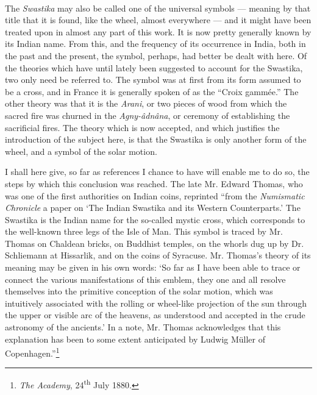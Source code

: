 \documentclass[a4paper, 11pt, oneside, polutonikogreek, english]{article}
\begin{document}
\paragraph{}
The \emph{Swastika} may also be called one of the universal symbols --- meaning by that title that it is found, like the wheel, almost everywhere --- and it might have been treated upon in almost any part of this work. It is now pretty generally known by its Indian name. From this, and the frequency of its occurrence in India, both in the past and the present, the symbol, perhaps, had better be dealt with here. Of the theories which have until lately been suggested to account for the Swastika, two only need be referred to. The symbol was at first from its form assumed to be a cross, and in France it is generally spoken of as the ``Croix gammée.'' The other theory was that it is the \emph{Arani}, or two pieces of wood from which the sacred fire was churned in the \emph{Agny-âdnâna}, or ceremony of establishing the sacrificial fires. The theory which is now accepted, and which justifies the introduction of the subject here, is that the Swastika is only another form of the wheel, and a symbol of the solar motion.

I shall here give, so far as references I chance to have will enable me to do so, the steps by which this conclusion was reached. The late Mr. Edward Thomas, who was one of the first authorities on Indian coins, reprinted ``from the \emph{Numismatic Chronicle} a paper on `The Indian Swastika and its Western Counterparts.' The Swastika is the Indian name for the so-called mystic cross, which corresponds to the well-known three legs of the Isle of Man. This symbol is traced by Mr. Thomas on Chaldean bricks, on Buddhist temples, on the whorls dug up by Dr. Schliemann at Hissarlik, and on the coins of Syracuse. Mr. Thomas's theory of its meaning may be given in his own words: `So far as I have been able to trace or connect the various manifestations of this emblem, they one and all resolve themselves into the primitive conception of the solar motion, which was intuitively associated with the rolling or wheel-like projection of the sun through the upper or visible arc of the heavens, as understood and accepted in the crude astronomy of the ancients.' In a note, Mr. Thomas acknowledges that this explanation has been to some extent anticipated by Ludwig Müller of Copenhagen.''\footnote{\emph{The Academy}, 24\textsuperscript{th} July 1880.}
\end{document}
